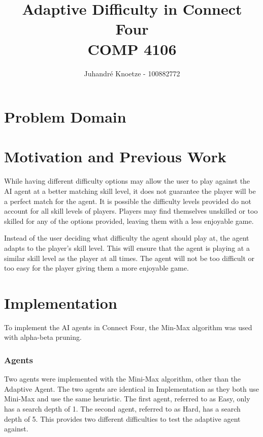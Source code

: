 \documentclass[12pt]{article}
\title{
    \vfill
    Adaptive Difficulty in Connect Four \\
    COMP 4106
}
\author{
    Juhandr\'{e} Knoetze - 100882772
}
\begin{document}
\begin{titlepage}
    \maketitle
    \vfill
    \thispagestyle{empty}
\end{titlepage}






\section*{Problem Domain}


\section*{Motivation and Previous Work}
While having different difficulty options may allow the user to play against the AI agent at a better matching skill level, it does not guarantee the player will be a perfect match for the agent. It is possible the difficulty levels provided do not account for all skill levels of players. Players may find themselves unskilled or too skilled for any of the options provided, leaving them with a less enjoyable game.

Instead of the user deciding what difficulty the agent should play at, the agent adapts to the player's skill level. This will ensure that the agent is playing at a similar skill level as the player at all times. The agent will not be too difficult or too easy for the player giving them a more enjoyable game.

\section*{Implementation}
To implement the AI agents in Connect Four, the Min-Max algorithm was used with alpha-beta pruning.

\subsubsection*{Agents}
Two agents were implemented with the Mini-Max algorithm, other than the Adaptive Agent. The two agents are identical in Implementation as they both use Mini-Max and use the same heuristic. The first agent, referred to as Easy, only has a search depth of 1. The second agent, referred to as Hard, has a search depth of 5. This provides two different difficulties to test the adaptive agent against.
\end{document}
